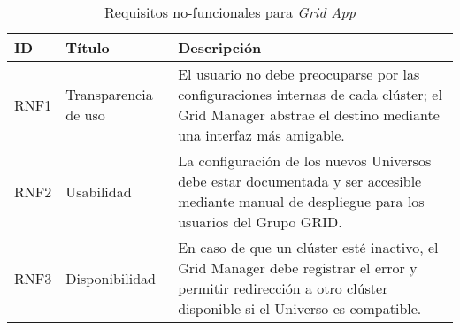 \begin{table}[H]
	\centering
	\sffamily\scriptsize
	\setlength{\tabcolsep}{4pt}
	\renewcommand{\arraystretch}{1.3}
	\caption{Requisitos no-funcionales para \textit{Grid App}}
	\label{table:requisitosNoFuncionales}
	\begin{tabular}{|p{}|p{}|p{}|}
		\toprule
		\textbf{ID}                              & \textbf{Título}                               & \textbf{Descripción} \\
		\midrule
		RNF1 & Transparencia de uso & El usuario no debe preocuparse por las configuraciones internas de cada clúster; el Grid Manager abstrae el destino mediante una interfaz más amigable. \\
		\midrule
		RNF2 & Usabilidad & La configuración de los nuevos Universos debe estar documentada y ser accesible mediante manual de despliegue para los usuarios del Grupo GRID. \\
		\midrule
		RNF3 & Disponibilidad & En caso de que un clúster esté inactivo, el Grid Manager debe registrar el error y permitir redirección a otro clúster disponible si el Universo es compatible. \\
		\bottomrule
	\end{tabular}
\end{table}